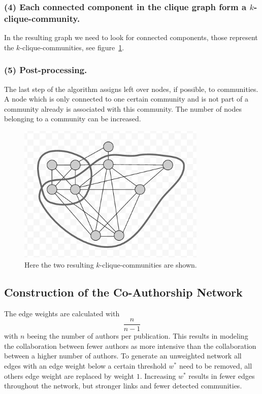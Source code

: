 \documentclass[runningheads,a4paper]{llncs}
\begin{document}
\subsubsection{(4) Each connected component in the clique graph form a $k$-clique-community.}
In the resulting graph we need to look for connected components, those represent the $k$-clique-communities, see figure~\ref{fig:result}.

\subsubsection{(5) Post-processing.}
The last step of the algorithm assigns left over nodes, if possible, to communities. A node which is only connected to one certain community and is not part of a community already is associated with this community. The number of nodes belonging to a community can be increased.

\begin{figure}
\begin{center}
	\includegraphics[width=0.8\textwidth]{result}
		\caption{Here the two resulting $k$-clique-communities are shown.}
		\label{fig:result}
\end{center}
\end{figure}


\subsection{Construction of the Co-Authorship Network}
\label{cpm-construction}
The edge weights are calculated with $$\frac{n}{n-1}$$ with $n$ beeing the number of authors per publication.
This results in modeling the collaboration between fewer authors as more intensive than the collaboration between a higher number of authors.  
To generate an unweighted network all edges with an edge weight below a certain threshold $w^*$ need to be removed, all others edge weight are replaced by weight $1$. Increasing $w^*$ results in fewer edges throughout the network, but stronger links and fewer detected communities.
\end{document}
